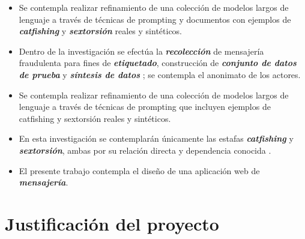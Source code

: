 \begin{itemize}
    \item Se contempla realizar refinamiento de una colección de modelos largos de lenguaje a través de técnicas de prompting y documentos con ejemplos de \textbf{\textit{catfishing}} y \textbf{\textit{sextorsión}} reales y sintéticos.

    \item Dentro de la investigación se efectúa la \textbf{\textit{recolección}} de mensajería fraudulenta para fines de \textbf{\textit{etiquetado}}, construcción de \textbf{\textit{conjunto de datos de prueba}} y \textbf{\textit{síntesis de datos}} \cite{SynthDataByIbm}; se contempla el anonimato de los actores.

    \item Se contempla realizar refinamiento de una colección de modelos largos de lenguaje a través de técnicas de prompting que incluyen ejemplos de catfishing y sextorsión reales y sintéticos.

    \item En esta investigación se contemplarán únicamente las estafas \textbf{\textit{catfishing}} y \textbf{\textit{sextorsión}}, ambas por su relación directa y dependencia conocida \cite{To_pay_or_not_to_pay}. %

    \item El presente trabajo contempla el diseño de una aplicación web de \textbf{\textit{mensajería}}.
\end{itemize}








\section{Justificación del proyecto} 

